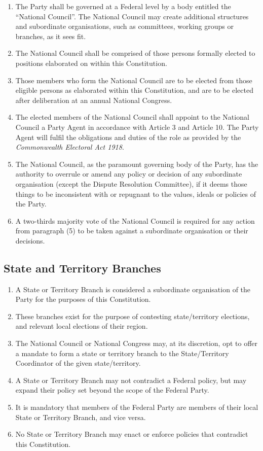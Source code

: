 \documentclass[a4paper,titlepage,8.5pt]{article}
\begin{document}
\begin{enumerate}
\item The Party shall be governed at a Federal level by a body entitled the ``National Council''. The National Council may create additional structures and subordinate organisations, such as committees, working groups or branches, as it sees fit.
\item The National Council shall be comprised of those persons formally elected to positions elaborated on within this Constitution.
\item Those members who form the National Council are to be elected from those eligible persons as elaborated within this Constitution, and are to be elected after deliberation at an annual National Congress.
\item The elected members of the National Council shall appoint to the National Council a Party Agent in accordance with Article 3 and Article 10. The Party Agent will fulfil the obligations and duties of the role as provided by the \textit{Commonwealth Electoral Act 1918}.
\item The National Council, as the paramount governing body of the Party, has the authority to overrule or amend any policy or decision of any subordinate organisation (except the Dispute Resolution Committee), if it deems those things to be inconsistent with or repugnant to the values, ideals or policies of the Party.
\item A two-thirds majority vote of the National Council is required for any action from paragraph (5) to be taken against a subordinate organisation or their decisions.
\end{enumerate}

\subsection{State and Territory Branches}

\begin{enumerate}
\item A State or Territory Branch is considered a subordinate organisation of the Party for the purposes of this Constitution.
\item These branches exist for the purpose of contesting state/territory elections, and relevant local elections of their region.
\item The National Council or National Congress may, at its discretion, opt to offer a mandate to form a state or territory branch to the State/Territory Coordinator of the given state/territory.
\item A State or Territory Branch may not contradict a Federal policy, but may expand their policy set beyond the scope of the Federal Party.
\item It is mandatory that members of the Federal Party are members of their local State or Territory Branch, and vice versa.
\item No State or Territory Branch may enact or enforce policies that contradict this Constitution.
\end{enumerate}
\end{document}
